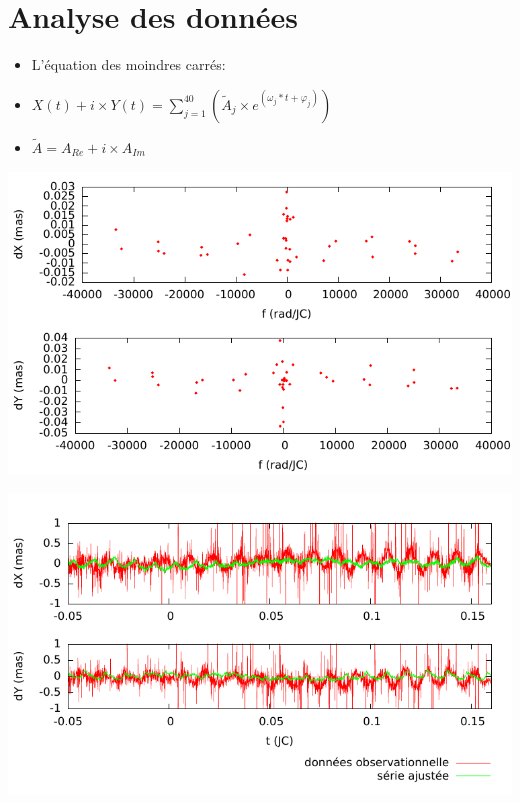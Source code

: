 \section{Analyse des données}

\begin{frame}
	\begin{itemize}
	  \item L'équation des moindres carrés:
      \item $X(t) + i \times Y(t) = \sum\limits_{j=1}^{40} (\widetilde{A}_{j} \times e^{(\omega_{j}*t + \varphi_{j})})$
      \item $\widetilde{A} = A_{Re} + i \times A_{Im}$
	\end{itemize}
\end{frame}

\begin{frame}
	\begin{center}
		\includegraphics[width=1.0\textwidth]{Figures/amplitude_freq.pdf}
	\end{center}
\end{frame}

\begin{frame}
	\begin{center}
		\includegraphics[width=1.0\textwidth]{Figures/fit_amplitude_ser_obs.pdf}
	\end{center}
\end{frame}

